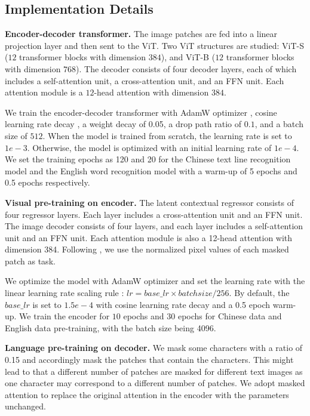 \subsection{Implementation Details}
\noindent\textbf{Encoder-decoder transformer.} The image patches are fed into a linear projection layer and then sent to the ViT. Two ViT structures are studied: ViT-S ($12$ transformer blocks with dimension $384$), and ViT-B ($12$ transformer blocks with dimension $768$). The decoder consists of four decoder layers, each of which includes a self-attention unit, a cross-attention unit, and an FFN unit. Each attention module is a $12$-head attention with dimension $384$.

We train the encoder-decoder transformer with AdamW optimizer \cite{adamw}, cosine learning rate decay \cite{cosinedecay}, a weight decay of 0.05, a drop path ratio of $0.1$, and a batch size of $512$. When the model is trained from scratch, the learning rate is set to $1e-3$. Otherwise, the model is optimized with an initial learning rate of $1e-4$. We set the training epochs as 120 and 20 for the Chinese text line recognition model and the English word recognition model with a warm-up of 5 epochs and 0.5 epochs respectively.  

\vspace{2mm}
\noindent\textbf{Visual pre-training on encoder.}
The latent contextual regressor consists of four regressor layers. Each layer includes a cross-attention unit and an FFN unit. The image decoder consists of four layers, and each layer includes a self-attention unit and an FFN unit. Each attention module is also a 12-head attention with dimension 384. Following \cite{mae}, we use the normalized pixel values of each masked patch as task.

We optimize the model with AdamW optimizer and set the learning rate with the linear learning rate scaling rule \cite{linear-rule}: $lr=base\_lr \times batch size / 256$. By default, the $base\_lr$ is set to $1.5e-4$ with cosine learning rate decay and a 0.5 epoch warm-up.  We train the encoder for $10$ epochs and $30$ epochs for Chinese data and English data pre-training, with the batch size being 4096. 

\vspace{2mm}
\noindent\textbf{Language pre-training on decoder.}
We mask some characters with a ratio of 0.15 and accordingly mask the patches that contain the characters. This might lead to that a different number of patches are masked for different text images as one character may correspond to a different number of patches. We adopt masked attention to replace the original attention in the encoder with the parameters unchanged.

